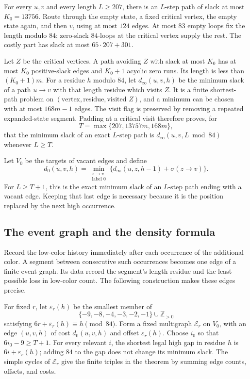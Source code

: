 \documentclass[11pt,reqno]{amsart}
\theoremstyle{plain}
\theoremstyle{plain}
\theoremstyle{plain}
\begin{document}
For every $u,v$ and every length $L\ge207$, there is an $L$-step path
of slack at most $K_0=13756$. Route through the empty state, a fixed
critical vertex, the empty state again, and then $v$, using at most
$124$ edges. At most $83$ empty loops fix the length modulo $84$;
zero-slack $84$-loops at the critical vertex supply the rest. The costly
part has slack at most $65\cdot207+301$.

Let $Z$ be the critical vertices. A path avoiding $Z$ with slack at most
$K_0$ has at most $K_0$ positive-slack edges and $K_0+1$ acyclic zero runs.
Its length is less than $(K_0+1)m$. For a residue $h$ modulo $84$, let
$d_\infty(u,v,h)$ be the minimum slack of a path $u\to v$ with that
length residue which visits $Z$. It is a finite shortest-path problem
on $(\text{vertex},\text{residue},\text{visited }Z)$, and a minimum can
be chosen with at most $168m-1$ edges. The visit flag is preserved by
removing a repeated expanded-state segment. Padding at a critical visit
therefore proves, for
\[
T=\max\{207,13757m,168m\},
\]
that the minimum slack of an exact $L$-step path is
$d_\infty(u,v,L\bmod84)$ whenever $L\ge T$.

Let $V_0$ be the targets of vacant edges and define
\[
d_0(u,v,h)=\min_{\substack{z\to v\\\text{label }0}}
    \{d_\infty(u,z,h-1)+\sigma(z\to v)\}.
\]
For $L\ge T+1$, this is the exact minimum slack of an $L$-step path
ending with a vacant edge. Keeping that last edge is necessary because
it is the position replaced by the next high occurrence.

\subsection{The event graph and the density formula}

Record the low-color history immediately after each occurrence of the additional
color. A segment between consecutive such occurrences becomes one edge of a
finite event graph. Its data record the segment's length residue and the least
possible loss in low-color count. The following construction makes these
edges precise.



For fixed $r$, let $\varepsilon_r(h)$ be the smallest member of
\[
\{-9,-8,-4,-3,-2,-1\}\cup\mathbb Z_{>0}
\]
satisfying $6r+\varepsilon_r(h)\equiv h\pmod {84}$. Form a fixed
multigraph $\mathcal E_r$ on $V_0$, with an edge $(u,v,h)$ of cost
$d_0(u,v,h)$ and offset $\varepsilon_r(h)$. Choose $i_0$ so that
$6i_0-9\ge T+1$. For every relevant $i$, the shortest legal high gap
in residue $h$ is $6i+\varepsilon_r(h)$; adding $84$ to the gap does
not change its minimum slack. The simple cycles of $\mathcal E_r$
give the finite triples in the theorem by summing edge counts, offsets,
and costs.
\end{document}

